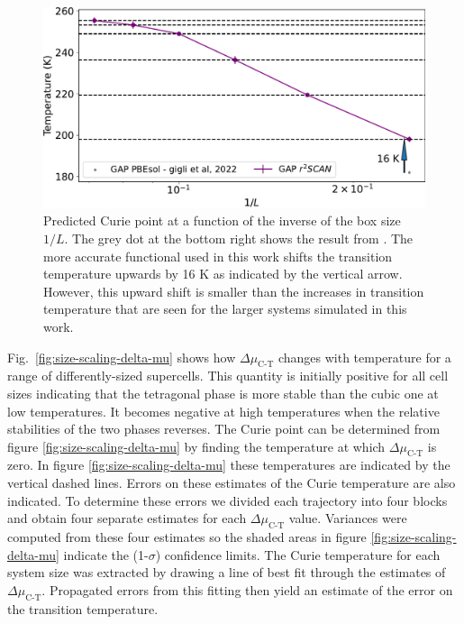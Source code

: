 \begin{figure}
    \centering
    \includegraphics[width=0.8\linewidth]{fig/Size-scaling-Temp.pdf}
    \caption{Predicted Curie point at a function of the inverse of the box size $1/L$.  The grey dot at the bottom right shows the result from \cite{gigli_thermodynamics_2022}. The more accurate functional used in this work shifts the transition temperature upwards by 16 K as indicated by the vertical arrow. However, this upward shift is smaller than the increases in transition temperature that are seen for the larger systems simulated in this work.}
    \label{fig:size-scaling-temp}
\end{figure}

Fig.~\ref{fig:size-scaling-delta-mu} shows how $\Delta\mu_{\textrm{C-T}}$ changes with temperature for a range of differently-sized supercells.  This quantity is initially positive for all cell sizes indicating that the tetragonal phase is more stable than the cubic one at low temperatures.  It becomes negative at high temperatures when the relative stabilities of the two phases reverses.  The Curie point can be determined from figure  \ref{fig:size-scaling-delta-mu} by finding the temperature at which $\Delta\mu_{\textrm{C-T}}$ is zero.  In figure \ref{fig:size-scaling-delta-mu} these temperatures are indicated by the vertical dashed lines.  Errors on these estimates of the Curie temperature are also indicated. To determine these errors we divided each trajectory into four blocks and obtain four separate estimates for each $\Delta\mu_{\textrm{C-T}}$ value.  Variances were computed from these four estimates so the shaded areas in figure \ref{fig:size-scaling-delta-mu} indicate the (1-$\sigma$) confidence limits.  The Curie temperature for each system size was extracted by drawing a line of best fit through the estimates of    $\Delta\mu_{\textrm{C-T}}$.  Propagated errors from this fitting then yield an estimate of the error on the transition temperature.

